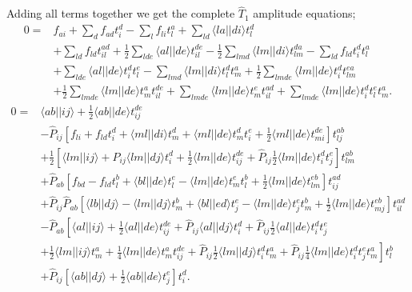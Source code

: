 \documentclass[aps,twocolumn,showpacs,floatfix,nofootinbib,preprintnumbers,superscriptaddress,amsmath,amssymb]{revtex4-1}
\begin{document}
Adding all terms together we get the complete $\hat{T}_1$ amplitude equations;
\begin{equation}
\label{eq:CC:t1eq_raw}
\begin{split}
0 =& f_{ai}
+ \sum_d f_{ad} t_i^d - \sum_l f_{li} t_l^a
 + \sum_{ld} \langle la||di \rangle t_l^d
\\
 &+ \sum_{ld} f_{ld} t_{il}^{ad}
 + \frac{1}{2} \sum_{lde} \langle al||de \rangle t_{il}^{de} - \frac{1}{2} \sum_{lmd}
\langle lm||di \rangle t_{lm}^{da}  
- \sum_{ld} f_{ld} t_i^d t_l^a
\\
& + \sum_{lde} \langle al||de \rangle t_i^d t_l^e 
- \sum_{lmd} \langle lm||di \rangle t_l^d t_m^a
+ \frac{1}{2} \sum_{lmde} \langle lm||de \rangle t_i^d t_{lm}^{ea} 
\\
&+ \frac{1}{2} \sum_{lmde} \langle lm||de \rangle t_m^a t_{il}^{de}
+ \sum_{lmde} \langle lm||de \rangle t_m^e t_{il}^{ad}
+ \sum_{lmde} \langle lm||de \rangle t_i^d t_l^e t_m^a .
\end{split}
\end{equation}
\begin{equation}
\label{eq:CC:t2eq_raw}
\begin{split}
0 =&
\langle ab || ij \rangle
+\frac{1}{2} \langle ab||de \rangle t_{ij}^{de}
\\
&
- \hat{P}_{ij} \left[
f_{li} + f_{ld} t_{i}^d + \langle ml||di \rangle t_m^d + \langle ml||de \rangle t_m^d t_i^e 
+\frac{1}{2}\langle ml||de \rangle t_{mi}^{de}  
\right] t_{lj}^{ab}
\\
&
+ \frac{1}{2} \left[
\langle lm||ij \rangle + \hat{P}_{ij} \langle lm||dj \rangle t_i^d 
+\frac{1}{2} \langle lm||de \rangle t_{ij}^{de} +\hat{P}_{ij} \frac{1}{2} \langle lm||de \rangle t_i^d t_j^e 
\right]  t_{lm}^{ab}
\\
&
+ \hat{P}_{ab} \left[
f_{bd} - f_{ld} t_l^b + \langle bl||de \rangle t_l^e - \langle lm||de \rangle t_m^e t_l^b 
+ \frac{1}{2} \langle lm||de \rangle t_{lm}^{eb}
\right] t_{ij}^{ad} 
\\
&
+\hat{P}_{ij} \hat{P}_{ab} \left[
\langle lb||dj \rangle - \langle lm||dj \rangle t_{m}^b + \langle bl||ed \rangle t_{j}^e
- \langle lm||de \rangle t_j^e t_m^b + \frac{1}{2} \langle lm||de \rangle t_{mj}^{eb}
\right] t_{il}^{ad}
\\
&
-\hat{P}_{ab} \left[
\langle al||ij \rangle + \frac{1}{2} \langle al||de \rangle t_{ij}^{de} 
+ \hat{P}_{ij} \langle al||dj \rangle t_i^d 
+ \hat{P}_{ij} \frac{1}{2} \langle al||de \rangle t_i^d t_j^e \right.
\\&
\left. + \frac{1}{2} \langle lm||ij \rangle t_m^a
+ \frac{1}{4} \langle lm||de \rangle t_m^a t_{ij}^{de} 
+ \hat{P}_{ij} \frac{1}{2} \langle lm||dj \rangle t_i^d t_m^a
+ \hat{P}_{ij} \frac{1}{4} \langle lm||de \rangle t_i^d t_j^e t_m^a
\right] t_l^b
\\
&
+ \hat{P}_{ij} \left[
\langle ab || dj \rangle + \frac{1}{2} \langle ab||de \rangle t_j^e
\right] t_i^d .
\end{split}
\end{equation}
\end{document}
